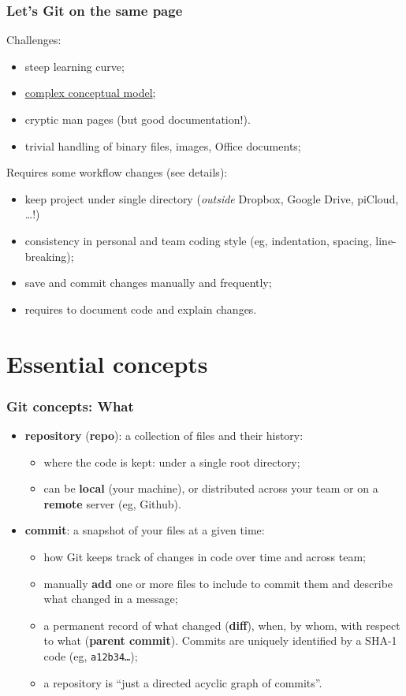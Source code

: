 \documentclass[10pt,svgnames,handout]{beamer}
\begin{document}
\begin{frame}
\frametitle{Let's Git on the same page}
\label{git_cons}

Challenges:
\begin{itemize}
  \item steep learning curve;
  \item \hyperlink{xkcd_git}{complex conceptual model};
  \item cryptic man pages (but good documentation!).
  \item trivial handling of binary files, images, Office documents;
\end{itemize}

\medskip

Requires some workflow changes (\hypertarget{style}{see details}):
\begin{itemize}
  \item keep project under single directory (\emph{outside} Dropbox, Google Drive, piCloud, \ldots!)
  \item consistency in personal and team coding style (eg, indentation, spacing, line-breaking);
  \item save and commit changes manually and frequently;
  \item requires to document code and explain changes.
\end{itemize}
\end{frame}


\section{Essential concepts}
\begin{frame}
\frametitle{Git concepts: What}
    
\begin{itemize}[<+->]
\item \textbf{repository} (\textbf{repo}): a collection of files and their history:
\begin{itemize}
   \item where the code is kept: under a single root directory;
   \item can be \textbf{local} (your machine), or distributed across your team or on a \textbf{remote} server (eg, Github).
 \end{itemize}

\item \textbf{commit}: a snapshot of your files at a given time:
\begin{itemize}
  \item how Git keeps track of changes in code over time and across team;
  \item manually \textbf{add} one or more files to include to commit them and describe what changed in a message;
  \item a permanent record of what changed (\textbf{diff}), when, by whom, with respect to what (\textbf{parent commit}). Commits are uniquely identified by a SHA-1 code (eg, \texttt{a12b34\ldots});
  \item a repository is “just a directed acyclic graph of commits”.
\end{itemize}
\end{itemize}
\end{frame}
\end{document}
